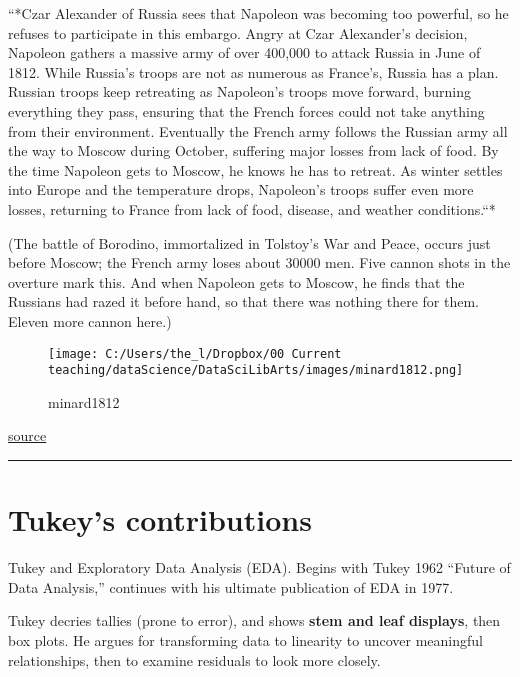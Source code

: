 \documentclass[]{book}
\theoremstyle{definition}
\theoremstyle{definition}
\theoremstyle{definition}
\theoremstyle{remark}
\begin{document}
``*Czar Alexander of Russia sees that Napoleon was becoming too
powerful, so he refuses to participate in this embargo. Angry at Czar
Alexander's decision, Napoleon gathers a massive army of over 400,000 to
attack Russia in June of 1812. While Russia's troops are not as numerous
as France's, Russia has a plan. Russian troops keep retreating as
Napoleon's troops move forward, burning everything they pass, ensuring
that the French forces could not take anything from their environment.
Eventually the French army follows the Russian army all the way to
Moscow during October, suffering major losses from lack of food. By the
time Napoleon gets to Moscow, he knows he has to retreat. As winter
settles into Europe and the temperature drops, Napoleon's troops suffer
even more losses, returning to France from lack of food, disease, and
weather conditions.``*

(The battle of Borodino, immortalized in Tolstoy's War and Peace, occurs
just before Moscow; the French army loses about 30000 men. Five cannon
shots in the overture mark this. And when Napoleon gets to Moscow, he
finds that the Russians had razed it before hand, so that there was
nothing there for them. Eleven more cannon here.)

\begin{figure}
\centering
\texttt{[image: C:/Users/the\_l/Dropbox/00 Current teaching/dataScience/DataSciLibArts/images/minard1812.png]}
\caption{minard1812}
\end{figure}

\href{https://datavizblog.com/2013/05/30/dataviz-history-charles-minards-flow-map-of-napoleons-russian-campaign-of-1812-polotsk-smolensk-and-on-to-borodino/}{source}

\begin{center}\rule{0.5\linewidth}{\linethickness}\end{center}

\section{Tukey's contributions}\label{tukeys-contributions}

Tukey and Exploratory Data Analysis (EDA). Begins with Tukey 1962
``Future of Data Analysis,'' continues with his ultimate publication of
EDA in 1977.

Tukey decries tallies (prone to error), and shows \textbf{stem and leaf
displays}, then box plots. He argues for transforming data to linearity
to uncover meaningful relationships, then to examine residuals to look
more closely.
\end{document}
